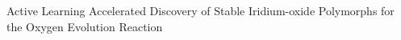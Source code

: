 Active Learning Accelerated Discovery of Stable Iridium-oxide Polymorphs for the Oxygen Evolution Reaction
